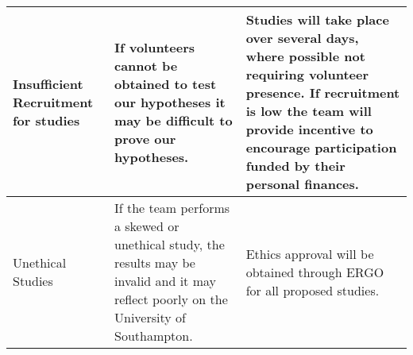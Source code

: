 \begin{center}
\begin{landscape}
\begin{longtable}{|p{3cm}|p{7cm}|p{12cm}|}
        Insufficient Recruitment for studies             & If volunteers cannot be obtained to test our hypotheses it may be difficult to prove our hypotheses.                                                                                                                                                                                                                                                                         & Studies will take place over several days, where possible not requiring volunteer presence. If recruitment is low the team will provide incentive to encourage participation funded by their personal finances.                                                                                                                                                                                                                                                                                                                                                                                                                                                                                                                                                                                                                                                                                                                                                                                                                          \\ \hline
        Unethical Studies                                & If the team performs a skewed or unethical study, the results may be invalid and it may reflect poorly on the University of Southampton.                                                                                                                                                                                                                                     & Ethics approval will be obtained through ERGO for all proposed studies.                                                                                                                                                                                                                                                                                                                                                                                                                                                                                                                                                                                                                                                                                                                                                                                                                                                                                                                                                                  \\ \hline

\end{longtable}
\end{landscape}
\end{center}
